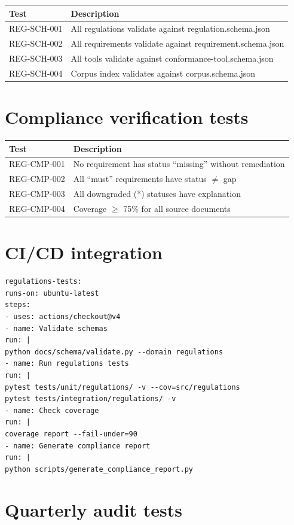 \documentclass[11pt,a4paper,twoside]{report}
\begin{document}
\begin{tabularx}{\linewidth}{@{}l X@{}}
\toprule
\textbf{Test} & \textbf{Description} \\ \midrule
REG-SCH-001 & All regulations validate against regulation.schema.json \\
REG-SCH-002 & All requirements validate against requirement.schema.json \\
REG-SCH-003 & All tools validate against conformance-tool.schema.json \\
REG-SCH-004 & Corpus index validates against corpus.schema.json \\
\bottomrule
\end{tabularx}

\section{Compliance verification tests}

\begin{tabularx}{\linewidth}{@{}l X@{}}
\toprule
\textbf{Test} & \textbf{Description} \\ \midrule
REG-CMP-001 & No requirement has status ``missing'' without remediation \\
REG-CMP-002 & All ``must'' requirements have status $\neq$ gap \\
REG-CMP-003 & All downgraded (*) statuses have explanation \\
REG-CMP-004 & Coverage $\geq$ 75\% for all source documents \\
\bottomrule
\end{tabularx}

\section{CI/CD integration}

\begin{lstlisting}[basicstyle=\ttfamily\small,caption={GitHub Actions workflow excerpt.}]
regulations-tests:
runs-on: ubuntu-latest
steps:
- uses: actions/checkout@v4
- name: Validate schemas
run: |
python docs/schema/validate.py --domain regulations
- name: Run regulations tests
run: |
pytest tests/unit/regulations/ -v --cov=src/regulations
pytest tests/integration/regulations/ -v
- name: Check coverage
run: |
coverage report --fail-under=90
- name: Generate compliance report
run: |
python scripts/generate_compliance_report.py
\end{lstlisting}

\section{Quarterly audit tests}\label{sec:quarterly-audit}
\end{document}
